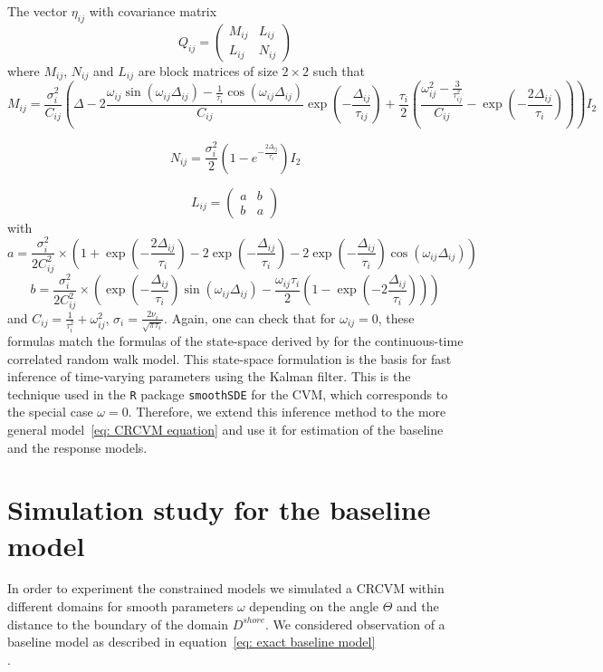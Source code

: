 \documentclass[11pt]{article}
\newcommand {\1}{\mathbb{1}}
\begin{document}
The vector $\eta_{ij}$ with covariance matrix 
\begin{equation}
	Q_{ij}=\begin{pmatrix}
		M_{ij} & L_{ij} \\
		L_{ij} & N_{ij}
	\end{pmatrix}
	\label{eq: state space covariance}
\end{equation}
where $M_{ij}$, $N_{ij}$ and $L_{ij}$ are block matrices of size $2 \times 2$ such that 
\[M_{ij}=\frac{\sigma_i^2}{C_{ij}}\left( \Delta-2 \frac{\omega_{ij} \sin(\omega_{ij} \Delta_{ij})-\frac{1}{\tau_{i}} \cos(\omega_{ij} \Delta_{ij})}{C_{ij} } \exp\left( -\frac{\Delta_{ij}}{\tau_{ij}} \right) +\frac{\tau_{i}}{2} \left( \frac{\omega_{ij}^2-\frac{3}{\tau_{ij}^2}}{C_{ij}}-\exp\left( -\frac{2\Delta_{ij}}{\tau_i}\right)\right) \right)I_2\]

\[N_{ij}=\frac{\sigma_i^2}{2}\left(1-e^{-\frac{2 \Delta_{ij}}{\tau_{i}}}\right)I_2\]

\[L_{ij}=\begin{pmatrix} a & b \\
	b & a\end{pmatrix}\]
with
\[a=\frac{\sigma_i^2}{2 C_{ij}^2 } \times \left( 1+\exp\left( -\frac{2\Delta_{ij}}{\tau_{i}}\right)-2\exp\left( -\frac{\Delta_{ij}}{\tau_{i}}\right)-2\exp\left( -\frac{\Delta_{ij}}{\tau_{i}}\right) \cos(\omega_{ij}\Delta_{ij})\right)\]
\[b=\frac{\sigma_{i}^2}{2 C_{ij}^2} \times\left( \exp\left( -\frac{\Delta_{ij}}{\tau_{i}}\right) \sin(\omega_{ij} \Delta_{ij})-\frac{\omega_{ij} \tau_{i}}{2} \left(1-\exp\left( -2 \frac{\Delta_{ij}}{\tau_{i}}\right) \right)\right)\]
and $C_{ij}=\frac{1}{\tau_i^2}+\omega_{ij}^2$, $\sigma_{i}=\frac{2\nu_i}{\sqrt{\pi \tau_i}}$.
Again, one can check that for $\omega_{ij}=0$, these formulas match the formulas of the state-space derived by \cite{johnson_continuoustime_2008} for the continuous-time correlated random walk model.
This state-space formulation is the basis for fast inference of time-varying parameters using the Kalman filter. This is the technique used in the \texttt{R} package \texttt{smoothSDE} \cite{michelot_varying-coefficient_2021} for the CVM, which corresponds to the special case $\omega=0$. Therefore, we extend this inference method to the more general model~\ref{eq: CRCVM equation} and use it for estimation of the baseline and the response models.




\section{Simulation study for the baseline model}
\label{section: simulation constrained motion}
In order to experiment the constrained models we simulated a CRCVM within different domains for smooth parameters $\omega$ depending on the angle $\Theta$ and the distance to the boundary of the domain $D^{shore}$. We considered observation of a baseline model as described in equation~\ref{eq: exact baseline model}\\.
\end{document}
